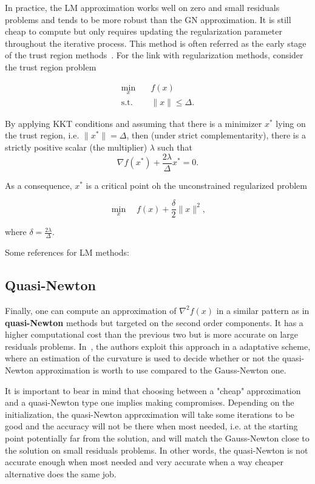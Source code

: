 \documentclass[10pt]{article}
\numberwithin{equation}{section}
\begin{document}
	In practice, the LM approximation works well on zero and small residuals problems and tends to be more robust than the GN approximation. It is still cheap to compute but only requires updating the regularization parameter throughout the iterative process. This method is often referred as the early stage of the trust region methods~\cite{conn-etal:2000}. For the link with regularization methods, consider the trust region problem
	 
	 \begin{equation*}
	 	\begin{aligned}
	 		\min_x \quad & f(x) \\
	 		\text{s.t.} \quad & \|x\| \le \Delta.
	 	\end{aligned}
	 \end{equation*}
	 
	 By applying KKT conditions and assuming that there is a minimizer $x^*$ lying on the trust region, i.e. $\|x^*\|=\Delta$, then (under strict complementarity), there is a strictly positive scalar (the multiplier) $\lambda$ such that
	 \[\nabla f(x^*) + \dfrac{2\lambda}{\Delta}x^*=0.\]
	 
	 As a consequence, $x^*$ is a critical point oh the unconstrained regularized problem
	 
	 \[\min_x \quad f(x) + \dfrac{\delta}{2} \|x\|^2,\]
	 
	 where $\delta=\frac{2\lambda}{\Delta}$.
	 
	 Some references for LM methods: \cite{bellavia-etal:2018}
	 
	 \subsection{Quasi-Newton}
	 
	 Finally, one can compute an approximation of $\nabla^2f(x)$ in a similar pattern as in \textbf{quasi-Newton} methods \cite[][Chapter 6]{nocedalwright:2006} but targeted on the second order components. It has a higher computational cost than the previous two but is more accurate on large residuals problems. In~\cite{dennisetal:1981}, the authors exploit this approach in a adaptative scheme, where an estimation of the curvature is used to decide whether or not the quasi-Newton approximation is worth to use compared to the Gauss-Newton one.
	 
	 It is important to bear in mind that choosing between a "cheap" approximation and a quasi-Newton type one implies making compromises. Depending on the initialization, the quasi-Newton approximation will take some iterations to be good and the accuracy will not be there when most needed, i.e. at the starting point potentially far from the solution, and will match the Gauss-Newton close to the solution on small residuals problems. In other words, the quasi-Newton is not accurate enough when most needed and very accurate when a way cheaper alternative does the same job.
	 
\end{document}
